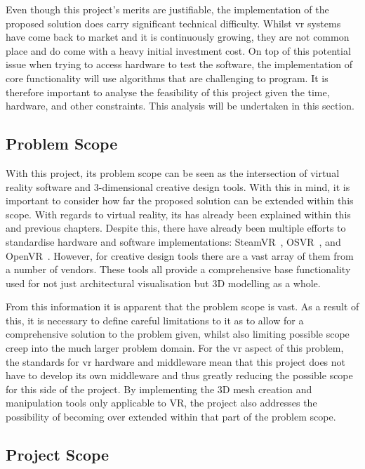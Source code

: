     Even though this project's merits are justifiable, the implementation of the proposed solution does carry significant technical difficulty. Whilst \acrshort{vr} systems have come back to market and it is continuously growing, they are not common place and do come with a heavy initial investment cost. On top of this potential issue when trying to access hardware to test the software, the implementation of core functionality will use algorithms that are challenging to program. It is therefore important to analyse the feasibility of this project given the time, hardware, and other constraints. This analysis will be undertaken in this section.
    
    \subsection{Problem Scope}
    
        With this project, its problem scope can be seen as the intersection of virtual reality software and 3-dimensional creative design tools. With this in mind, it is important to consider how far the proposed solution can be extended within this scope. With regards to virtual reality, its has already been explained within this and previous chapters. Despite this, there have already been multiple efforts to standardise hardware and software implementations: SteamVR~\cite{steamVRFAQ}, OSVR~\cite{osvrAbout}, and OpenVR~\cite{openVRAnnouncement}. However, for creative design tools there are a vast array of them from a number of vendors. These tools all provide a comprehensive base functionality used for not just architectural visualisation but 3D modelling as a whole.
        
        From this information it is apparent that the problem scope is vast. As a result of this, it is necessary to define careful limitations to it as to allow for a comprehensive solution to the problem given, whilst also limiting possible scope creep into the much larger problem domain. For the \acrshort{vr} aspect of this problem, the standards for \acrshort{vr} hardware and middleware mean that this project does not have to develop its own middleware and thus greatly reducing the possible scope for this side of the project. By implementing the 3D mesh creation and manipulation tools only applicable to VR, the project also addresses the possibility of becoming over extended within that part of the problem scope.
    
    \subsection{Project Scope}
    
